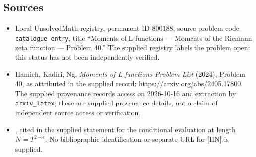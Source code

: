 \documentclass[11pt]{article}
\begin{document}
\subsection{Sources}
\begin{itemize}
\item Local UnsolvedMath registry, permanent ID \(800188\), source problem code \texttt{catalogue entry}, title ``Moments of L-functions --- Moments of the Riemann zeta function --- Problem 40.'' The supplied registry labels the problem open; this status has not been independently verified.
\item Hamieh, Kadiri, Ng, \emph{Moments of L-functions Problem List} (2024), Problem 40, as attributed in the supplied record: \url{https://arxiv.org/abs/2405.17800}. The supplied provenance records access on 2026-10-16 and extraction by \texttt{arxiv\_latex}; these are supplied provenance details, not a claim of independent source access or verification.
\item [HN], cited in the supplied statement for the conditional evaluation at length \(N=T^{2-\epsilon}\). No bibliographic identification or separate URL for [HN] is supplied.
\end{itemize}
\end{document}
